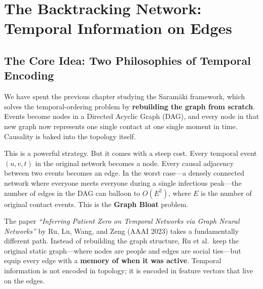 \chapter{The Backtracking Network: Temporal Information on Edges}

\section{The Core Idea: Two Philosophies of Temporal Encoding}

We have spent the previous chapter studying the Saram{\"a}ki framework, which solves the temporal-ordering problem by \textbf{rebuilding the graph from scratch}. Events become nodes in a Directed Acyclic Graph (DAG), and every node in that new graph now represents one single contact at one single moment in time. Causality is baked into the topology itself.

This is a powerful strategy. But it comes with a steep cost. Every temporal event $(u, v, t)$ in the original network becomes a node. Every causal adjacency between two events becomes an edge. In the worst case---a densely connected network where everyone meets everyone during a single infectious peak---the number of edges in the DAG can balloon to $O(E^2)$, where $E$ is the number of original contact events. This is the \textbf{Graph Bloat} problem.

The paper \textit{``Inferring Patient Zero on Temporal Networks via Graph Neural Networks''} by Ru, Lu, Wang, and Zeng (AAAI 2023) takes a fundamentally different path. Instead of rebuilding the graph structure, Ru et al.\ keep the original static graph---where nodes are people and edges are social ties---but equip every edge with a \textbf{memory of when it was active}. Temporal information is not encoded in topology; it is encoded in feature vectors that live on the edges.


